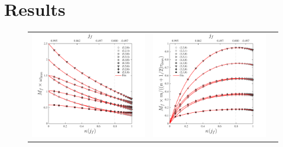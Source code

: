 \documentclass[twocolumn,aps,prd,floatfix,preprintnumbers,a4paper,nofootinbib,
superscriptaddress,10pt]{revtex4-1}
\begin{document}
%
\section{Results}
\label{results}

\begin{widetext}
	
\end{widetext}

\begin{widetext}
  
\end{widetext}

\begin{figure}
  \begin{tabular}{lcr}
    \includegraphics[width=\figfactor\textwidth]{fig/fits_w.pdf} & \includegraphics[width=\figfactor\textwidth]{fig/fits_tau.pdf}

\end{tabular}
\end{figure}
\end{document}
